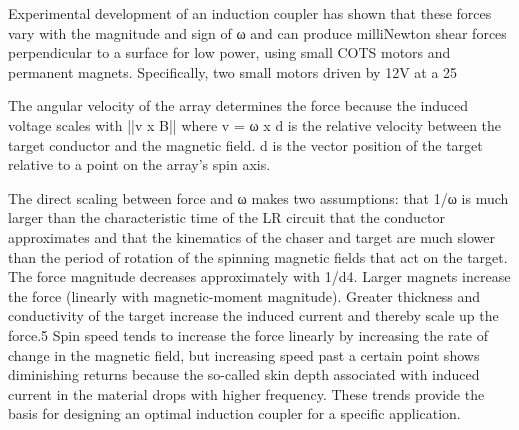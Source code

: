 Experimental development of an induction coupler has shown that these forces vary with the magnitude and sign of ω and can produce milliNewton shear forces perpendicular to a surface for low power, using small COTS motors and permanent magnets. Specifically, two small motors driven by 12V at a 25%

The angular velocity of the array determines the force because the induced voltage scales with ||v x B|| where v = ω x d is the relative velocity between the target conductor and the magnetic field. d is the vector position of the target relative to a point on the array’s‎ spin axis.

The direct scaling between force and ω makes two assumptions: that 1/ω is much larger than the characteristic time of the LR circuit that the conductor approximates and that the kinematics of the chaser and target are much slower than the period of rotation of the spinning magnetic fields that act on the target.
The force magnitude decreases approximately with 1/d4. Larger magnets increase the force (linearly with magnetic-moment magnitude). Greater thickness and conductivity of the target increase the induced current and thereby scale up the force.5‎ Spin speed tends to increase the force linearly by increasing the rate of change in the magnetic field, but increasing speed past a certain point shows diminishing returns because the so-called skin depth associated with induced current in the material drops with higher frequency. These trends provide the basis for designing an optimal induction coupler for a specific application.
